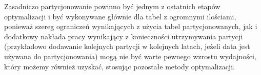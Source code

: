 Zasadniczo partycjonowanie powinno być jednym z ostatnich etapów optymalizacji i być wykonywane głównie dla tabel z ogromnymi ilościami, ponieważ szereg ograniczeń wynikających z użycia tabel partycjonowanych, jak i dodatkowy nakłada pracy wynikający z konieczności utrzymywania partycji (przykładowo dodawanie kolejnych partycji w kolejnych latach, jeżeli data jest używana do partycjonowania) mogą nie być warte pewnego wzrostu wydajności, który możemy również uzyskać, stosując pozostałe metody optymalizacji.

